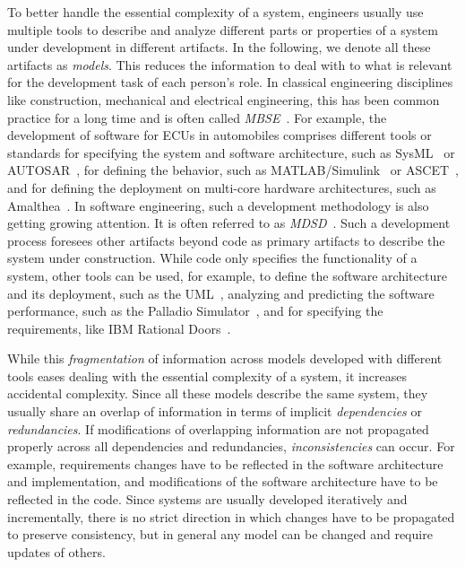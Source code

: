 To better handle the essential complexity of a system, engineers usually use multiple tools to describe and analyze different parts or properties of a system under development in different artifacts.
In the following, we denote all these artifacts as \emph{models}.
This reduces the information to deal with to what is relevant for the development task of each person's role.
In classical engineering disciplines like construction, mechanical and electrical engineering, this has been common practice for a long time and is often called \emph{\gls{MBSE}}~\cite{estefan2007MbseSurvey}.
For example, the development of software for \glspl{ECU} in automobiles comprises different tools or standards for specifying the system and software architecture, such as SysML~\cite{sysml} or AUTOSAR~\cite{scheid2015autosar}, for defining the behavior, such as MATLAB/Simulink~\cite{simulink} or ASCET~\cite{ascet}, and for defining the deployment on multi-core hardware architectures, such as Amalthea~\cite{amalthea, wolff2014a}.
In software engineering, such a development methodology is also getting growing attention.
It is often referred to as \emph{\gls{MDSD}}~\cite{stahl2006a}.
Such a development process foresees other artifacts beyond code as primary artifacts to describe the system under construction.
While code only specifies the functionality of a system, other tools can be used, for example, to define the software architecture and its deployment, such as the \gls{UML}~\cite{uml}, analyzing and predicting the software performance, such as the Palladio Simulator~\cite{reussner2016a}, and for specifying the requirements, like IBM Rational Doors~\cite{laplante2012RequirementsEngineering-Book}.

While this \emph{fragmentation} of information across models developed with different tools eases dealing with the essential complexity of a system, it increases accidental complexity.
Since all these models describe the same system, they usually share an overlap of information in terms of implicit \emph{dependencies} or \emph{redundancies}.
If modifications of overlapping information are not propagated properly across all dependencies and redundancies, \emph{inconsistencies} can occur.
For example, requirements changes have to be reflected in the software architecture and implementation, and modifications of the software architecture have to be reflected in the code.
Since systems are usually developed iteratively and incrementally, there is no strict direction in which changes have to be propagated to preserve consistency, but in general any model can be changed and require updates of others.

